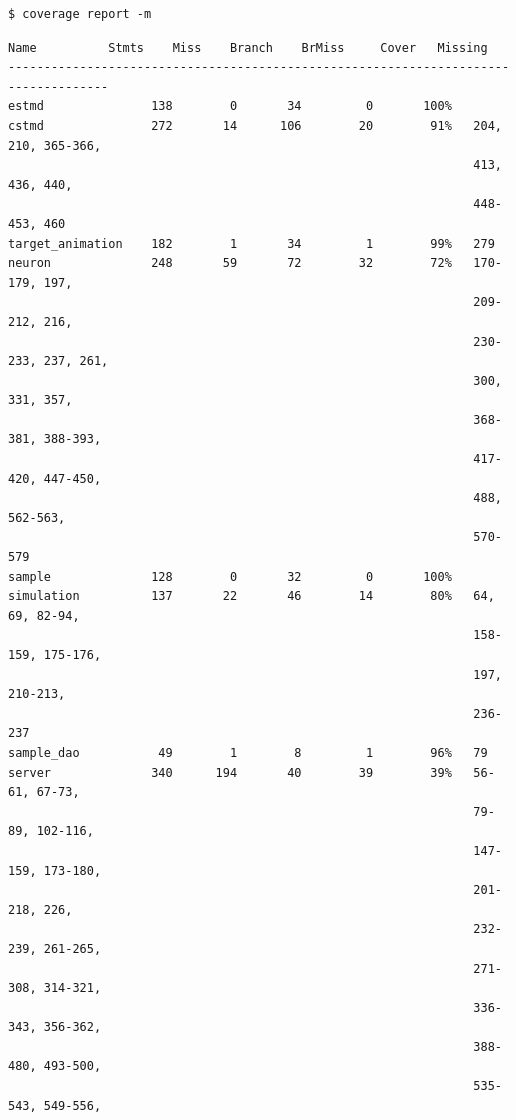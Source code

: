 \documentclass[a4paper,11pt]{article}
\begin{document}
\begin{verbatim}
$ coverage report -m
\end{verbatim}

\clearpage

\begin{verbatim}
Name 	      Stmts    Miss    Branch    BrMiss     Cover   Missing
------------------------------------------------------------------------------------
estmd               138        0       34         0       100%   
cstmd               272       14      106        20        91%   204, 210, 365-366, 
                                                                 413, 436, 440, 
                                                                 448-453, 460
target_animation    182        1       34         1        99%   279
neuron              248       59       72        32        72%   170-179, 197,
                                                                 209-212, 216,
                                                                 230-233, 237, 261,
                                                                 300, 331, 357, 
                                                                 368-381, 388-393,
                                                                 417-420, 447-450,
                                                                 488, 562-563,
                                                                 570-579
sample              128        0       32         0       100%   
simulation          137       22       46        14        80%   64, 69, 82-94, 
                                                                 158-159, 175-176, 
                                                                 197, 210-213, 
                                                                 236-237
sample_dao           49        1        8         1        96%   79
server              340      194       40        39        39%   56-61, 67-73, 
                                                                 79-89, 102-116,
                                                                 147-159, 173-180, 
                                                                 201-218, 226, 
                                                                 232-239, 261-265, 
                                                                 271-308, 314-321, 
                                                                 336-343, 356-362, 
                                                                 388-480, 493-500, 
                                                                 535-543, 549-556, 

\end{verbatim}
\end{document}
